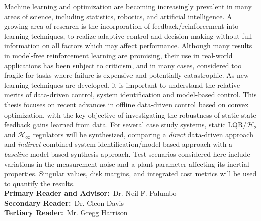 \label{chap:abstract}
\noindent Machine learning and optimization are becoming increasingly prevalent in many areas of science, including statistics, robotics, and artificial intelligence.  A growing area of research is the incorporation of feedback/reinforcement into learning techniques, to realize adaptive control and decision-making without full information on all factors which may affect performance.  Although many results in model-free reinforcement learning are promising, their use in real-world applications has been subject to criticism, and in many cases, considered too fragile for tasks where failure is expensive and potentially catastrophic. As new learning techniques are developed, it is important to understand the relative merits of data-driven control, system identification and model-based control.  This thesis focuses on recent advances in offline data-driven control based on convex optimization, with the key objective of investigating the robustness of static state feedback gains learned from data.  For several case study systems, static LQR/$\mathcal{H}_{2}$ and $\mathcal{H}_{\infty}$ regulators will be synthesized, comparing a \emph{direct} data-driven approach and \emph{indirect} combined system identification/model-based approach with a \emph{baseline} model-based synthesis approach.  Test scenarios considered here include variations in the measurement noise and a plant parameter affecting its inertial properties.  Singular values, disk margins, and integrated cost metrics will be used to quantify the results.\\

\noindent \textbf{Primary Reader and Advisor:}~Dr. Neil F. Palumbo \\
\textbf{Secondary Reader:}~Dr. Cleon Davis \\
\textbf{Tertiary Reader:}~Mr. Gregg Harrison\\